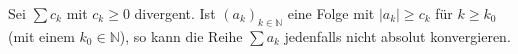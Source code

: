Sei $\sum c_k$ mit $c_k \geq 0$ divergent. Ist $(a_k)_{k \in \mathbb{N}}$ eine Folge mit $|a_k| \geq c_k$ für $k \geq k_0$ (mit einem $k_0 \in \mathbb{N}$), so kann die Reihe $\sum a_k$ jedenfalls nicht absolut konvergieren.